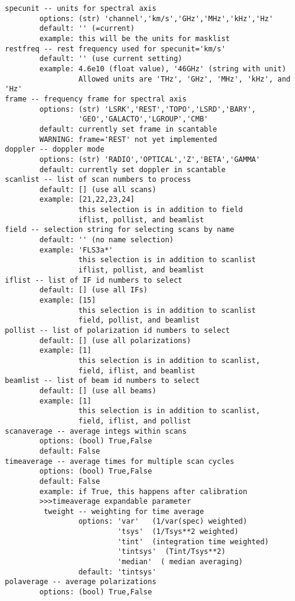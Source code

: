 \begin{verbatim}
specunit -- units for spectral axis
        options: (str) 'channel','km/s','GHz','MHz','kHz','Hz'
        default: '' (=current)
        example: this will be the units for masklist
restfreq -- rest frequency used for specunit='km/s'
        default: '' (use current setting)
        example: 4.6e10 (float value), '46GHz' (string with unit)
                 Allowed units are 'THz', 'GHz', 'MHz', 'kHz', and 'Hz'
frame -- frequency frame for spectral axis
        options: (str) 'LSRK','REST','TOPO','LSRD','BARY',
                 'GEO','GALACTO','LGROUP','CMB'
        default: currently set frame in scantable
        WARNING: frame='REST' not yet implemented
doppler -- doppler mode
        options: (str) 'RADIO','OPTICAL','Z','BETA','GAMMA'
        default: currently set doppler in scantable
scanlist -- list of scan numbers to process
        default: [] (use all scans)
        example: [21,22,23,24]
                 this selection is in addition to field
                 iflist, pollist, and beamlist
field -- selection string for selecting scans by name
        default: '' (no name selection)
        example: 'FLS3a*'
                 this selection is in addition to scanlist
                 iflist, pollist, and beamlist
iflist -- list of IF id numbers to select
        default: [] (use all IFs)
        example: [15]
                 this selection is in addition to scanlist
                 field, pollist, and beamlist
pollist -- list of polarization id numbers to select
        default: [] (use all polarizations)
        example: [1]
                 this selection is in addition to scanlist,
                 field, iflist, and beamlist
beamlist -- list of beam id numbers to select
        default: [] (use all beams)
        example: [1]
                 this selection is in addition to scanlist,
                 field, iflist, and pollist
scanaverage -- average integs within scans
        options: (bool) True,False
        default: False
timeaverage -- average times for multiple scan cycles
        options: (bool) True,False
        default: False
        example: if True, this happens after calibration
        >>>timeaverage expandable parameter
         tweight -- weighting for time average
                 options: 'var'   (1/var(spec) weighted)
                          'tsys'  (1/Tsys**2 weighted)
                          'tint'  (integration time weighted)
                          'tintsys'  (Tint/Tsys**2)
                          'median'  ( median averaging)
                 default: 'tintsys'
polaverage -- average polarizations
        options: (bool) True,False

\end{verbatim}
